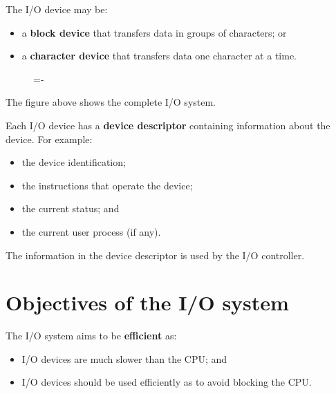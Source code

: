 \documentclass[a4paper]{systems-software}
\begin{document}
The I/O device may be:
\begin{itemize}
	\item a \textbf{block device} that transfers data in groups of characters; or
	\item a \textbf{character device} that transfers data one character at a time.
\end{itemize}

\begin{figure}[H]
  \lineskip=-\fboxrule
\end{figure}

The figure above shows the complete I/O system.

\newpage

Each I/O device has a \textbf{device descriptor} containing information about the device. For example:
\begin{itemize}
	\item the device identification;
	\item the instructions that operate the device;
	\item the current status; and
	\item the current user process (if any).
\end{itemize}

The information in the device descriptor is used by the I/O controller.


\section*{Objectives of the I/O system}

The I/O system aims to be \textbf{efficient} as:
\begin{itemize}
	\item I/O devices are much slower than the CPU; and
	\item I/O devices should be used efficiently as to avoid blocking the CPU.
\end{itemize}
\end{document}
